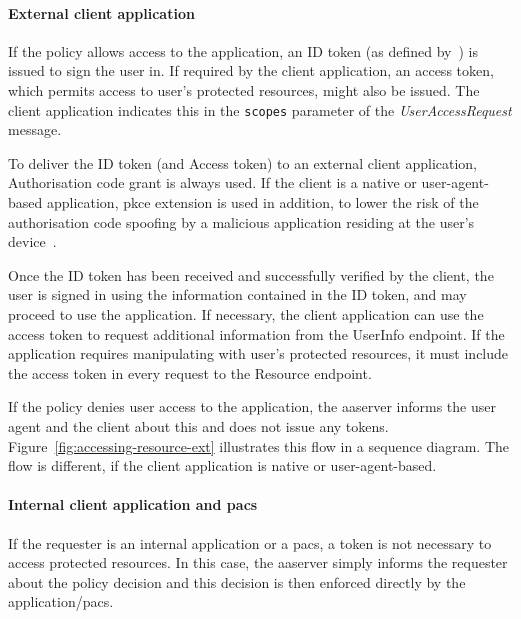 \paragraph{External client application}
If the policy allows access to the application, an ID token (as defined by~\cite{OpenID2014OpenID1}) is issued to sign the user in. If required by the client application, an access token, which permits access to user's protected resources, might also be issued. The client application indicates this in the \texttt{scopes} parameter of the \textit{UserAccessRequest} message.

To deliver the ID token (and Access token) to an external client application, Authorisation code grant is always used. If the client is a native or user-agent-based application, \acrshort{pkce} extension is used in addition, to lower the risk of the authorisation code spoofing by a malicious application residing at the user's device~\cite{Sakimura2015ProofClients}.

Once the ID token has been received and successfully verified by the client, the user is signed in using the information contained in the ID token, and may proceed to use the application. If necessary, the client application can use the access token to request additional information from the UserInfo endpoint. If the application requires manipulating with user's protected resources, it must include the access token in every request to the Resource endpoint.

If the policy denies user access to the application, the \acrshort{aaserver} informs the user agent and the client about this and does not issue any tokens. Figure~\ref{fig:accessing-resource-ext} illustrates this flow in a sequence diagram. The flow is different, if the client application is native or user-agent-based.

\paragraph{Internal client application and \acrshort{pacs}}
If the requester is an internal application or a \acrshort{pacs}, a token is not necessary to access protected resources. In this case, the \acrshort{aaserver} simply informs the requester about the policy decision and this decision is then enforced directly by the application/\acrshort{pacs}.

